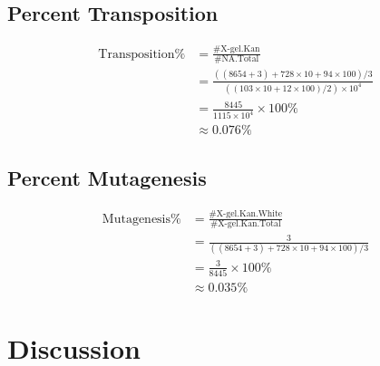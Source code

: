 \documentclass{article}
\begin{document}
		\subsection{Percent Transposition}
			$$
			\begin{aligned}
			\text{Transposition}\% &= \frac{\#\text{X-gel.Kan}}{\#\text{NA.Total}}\\
			&= \frac{((8654 + 3) + 728 \times 10 + 94 \times 100) / 3}{((103 \times 10 + 12 \times 100) / 2) \times 10 ^4}\\
			&= \frac{8445}{1115 \times 10 ^4} \times 100\%\\
			&\approx 0.076\%
			\end{aligned}
			$$
		\subsection{Percent Mutagenesis}
			$$
			\begin{aligned}
			\text{Mutagenesis}\% &= \frac{\#\text{X-gel.Kan.White}}{\#\text{X-gel.Kan.Total}}\\
			&= \frac{3}{((8654 + 3) + 728 \times 10 + 94 \times 100) / 3}\\
			&= \frac{3}{8445} \times 100\%\\
			&\approx 0.035\%
			\end{aligned}
			$$
	\section{Discussion}
\end{document}
